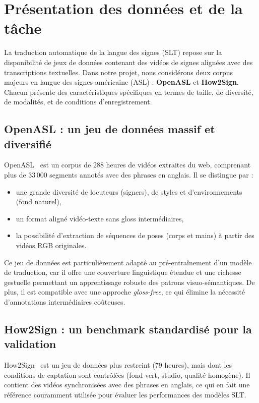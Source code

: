 \section{Présentation des données et de la tâche}

La traduction automatique de la langue des signes (SLT) repose sur la disponibilité de jeux de données contenant des vidéos de signes alignées avec des transcriptions textuelles. Dans notre projet, nous considérons deux corpus majeurs en langue des signes américaine (ASL) : \textbf{OpenASL} et \textbf{How2Sign}. Chacun présente des caractéristiques spécifiques en termes de taille, de diversité, de modalités, et de conditions d'enregistrement.

\subsection*{OpenASL : un jeu de données massif et diversifié}

OpenASL~\cite{shi2022openasl} est un corpus de 288 heures de vidéos extraites du web, comprenant plus de 33\,000 segments annotés avec des phrases en anglais. Il se distingue par :
\begin{itemize}
    \item une grande diversité de locuteurs (signers), de styles et d’environnements (fond naturel),
    \item un format aligné vidéo-texte sans gloss intermédiaires,
    \item la possibilité d’extraction de séquences de poses (corps et mains) à partir des vidéos RGB originales.
\end{itemize}

Ce jeu de données est particulièrement adapté au pré-entraînement d’un modèle de traduction, car il offre une couverture linguistique étendue et une richesse gestuelle permettant un apprentissage robuste des patrons visuo-sémantiques. De plus, il est compatible avec une approche \textit{gloss-free}, ce qui élimine la nécessité d’annotations intermédiaires coûteuses.

\subsection*{How2Sign : un benchmark standardisé pour la validation}

How2Sign~\cite{duarte2021how2sign} est un jeu de données plus restreint (79 heures), mais dont les conditions de captation sont contrôlées (fond vert, studio, qualité homogène). Il contient des vidéos synchronisées avec des phrases en anglais, ce qui en fait une référence couramment utilisée pour évaluer les performances des modèles SLT.


